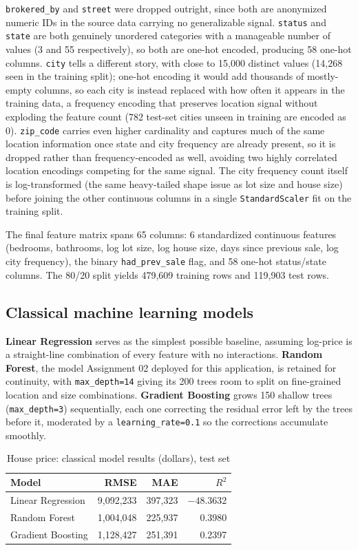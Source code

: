 \documentclass[11pt]{article}
\newcommand{\model}[1]{\textbf{#1}}
\begin{document}
\verb|brokered_by| and \verb|street| were dropped outright, since both are anonymized
numeric IDs in the source data carrying no generalizable signal. \verb|status| and
\verb|state| are both genuinely unordered categories with a manageable number of values
(3 and 55 respectively), so both are one-hot encoded, producing 58 one-hot columns.
\verb|city| tells a different story, with close to 15,000 distinct values (14,268 seen in
the training split); one-hot encoding it would add thousands of mostly-empty columns, so
each city is instead replaced with how often it appears in the training data, a frequency
encoding that preserves location signal without exploding the feature count (782 test-set
cities unseen in training are encoded as 0). \verb|zip_code| carries even higher
cardinality and captures much of the same location information once state and city
frequency are already present, so it is dropped rather than frequency-encoded as well,
avoiding two highly correlated location encodings competing for the same signal. The city
frequency count itself is log-transformed (the same heavy-tailed shape issue as lot size
and house size) before joining the other continuous columns in a single
\verb|StandardScaler| fit on the training split.

The final feature matrix spans 65 columns: 6 standardized continuous features (bedrooms,
bathrooms, log lot size, log house size, days since previous sale, log city frequency), the
binary \verb|had_prev_sale| flag, and 58 one-hot status/state columns. The 80/20 split
yields 479,609 training rows and 119,903 test rows.

\subsection{Classical machine learning models}

\model{Linear Regression} serves as the simplest possible baseline, assuming log-price is a
straight-line combination of every feature with no interactions. \model{Random Forest}, the
model Assignment 02 deployed for this application, is retained for continuity, with
\texttt{max\_depth=14} giving its 200 trees room to split on fine-grained location and size
combinations. \model{Gradient Boosting} grows 150 shallow trees (\texttt{max\_depth=3})
sequentially, each one correcting the residual error left by the trees before it, moderated
by a \texttt{learning\_rate=0.1} so the corrections accumulate smoothly.

\begin{table}[H]
\centering
\caption{House price: classical model results (dollars), test set}
\begin{tabular}{lrrr}
\toprule
Model & RMSE & MAE & $R^2$ \\
\midrule
Linear Regression & 9,092,233 & 397,323 & $-48.3632$ \\
Random Forest & 1,004,048 & 225,937 & 0.3980 \\
Gradient Boosting & 1,128,427 & 251,391 & 0.2397 \\
\bottomrule
\end{tabular}
\end{table}
\end{document}
